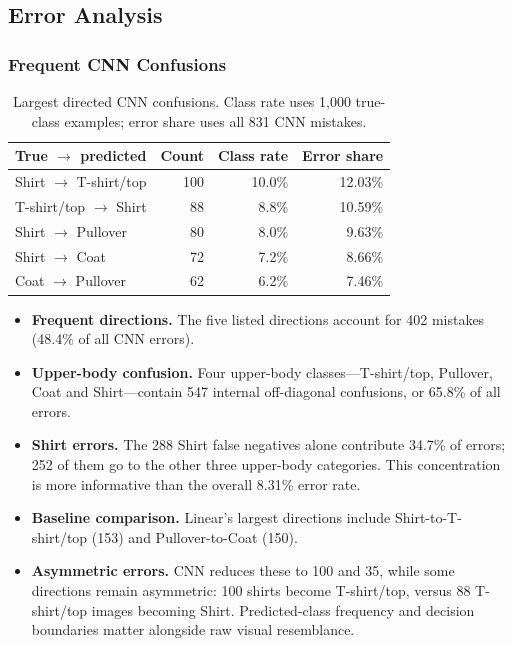\subsection{Error Analysis}
\subsubsection{Frequent CNN Confusions}
\begin{table}[!htbp]\centering\small
\caption{Largest directed CNN confusions. Class rate uses 1,000 true-class examples; error share uses all 831 CNN mistakes.}
\label{tab:cnnerrors}
\begin{tabular}{@{}lrrr@{}}\toprule
True $\to$ predicted & Count & Class rate & Error share\\\midrule
Shirt $\to$ T-shirt/top & 100 & 10.0\% & 12.03\% \\
T-shirt/top $\to$ Shirt & 88 & 8.8\% & 10.59\% \\
Shirt $\to$ Pullover & 80 & 8.0\% & 9.63\% \\
Shirt $\to$ Coat & 72 & 7.2\% & 8.66\% \\
Coat $\to$ Pullover & 62 & 6.2\% & 7.46\% \\
\bottomrule\end{tabular}\end{table}

\begin{itemize}
\setlength{\itemsep}{3pt}
\setlength{\parskip}{0pt}
\item \textbf{Frequent directions.} The five listed directions account for 402 mistakes (48.4\% of all CNN errors).
\item \textbf{Upper-body confusion.} Four upper-body classes---T-shirt/top, Pullover, Coat and Shirt---contain 547 internal off-diagonal confusions, or 65.8\% of all errors.
\item \textbf{Shirt errors.} The 288 Shirt false negatives alone contribute 34.7\% of errors; 252 of them go to the other three upper-body categories. This concentration is more informative than the overall 8.31\% error rate.

\item \textbf{Baseline comparison.} Linear's largest directions include Shirt-to-T-shirt/top (153) and Pullover-to-Coat (150).
\item \textbf{Asymmetric errors.} CNN reduces these to 100 and 35, while some directions remain asymmetric: 100 shirts become T-shirt/top, versus 88 T-shirt/top images becoming Shirt. Predicted-class frequency and decision boundaries matter alongside raw visual resemblance.
\end{itemize}

